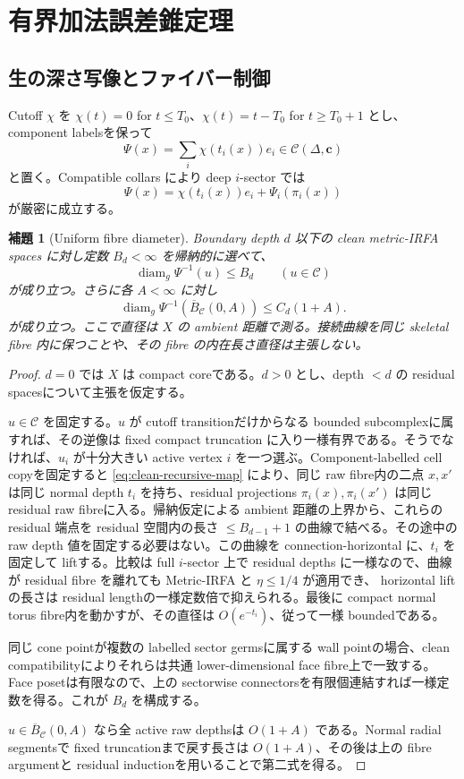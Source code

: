 \documentclass[11pt,a4paper]{ltjsarticle}
\newcommand{\diam}{\operatorname{diam}}
\newcommand{\cC}{\mathcal C}
\newcommand{\ov}{\overline}
\theoremstyle{plain}
\newtheorem{lemma}[lemma]{補題}
\theoremstyle{definition}
\theoremstyle{remark}
\begin{document}
\section{有界加法誤差錐定理}
\label{sec:rough}

\subsection{生の深さ写像とファイバー制御}
Cutoff $\chi$ を $\chi(t)=0$ for $t\le T_0$、$\chi(t)=t-T_0$ for $t\ge T_0+1$ とし、component labelsを保って
\begin{equation}
\label{eq:rawmap}
 \Psi(x)=\sum_i\chi(t_i(x))e_i\in\cC(\Delta,\bm c)
\end{equation}
と置く。Compatible collars により deep $i$-sector では
\begin{equation}
\label{eq:rawrecursive}
 \Psi(x)=\chi(t_i(x))e_i+\Psi_i(\pi_i(x))
\end{equation}
が厳密に成立する。

\begin{lemma}[Uniform fibre diameter]
\label{lem:fibres}
Boundary depth $d$ 以下の clean metric-IRFA spaces に対し定数 $B_d<\infty$ を帰納的に選べて、
\[
 \diam_g\Psi^{-1}(u)\le B_d
 \qquad(u\in\cC)
\]
が成り立つ。さらに各 $A<\infty$ に対し
\[
 \diam_g\Psi^{-1}(\ov B_\cC(0,A))\le C_d(1+A).
\]
が成り立つ。ここで直径は $X$ の ambient 距離で測る。接続曲線を同じ
skeletal fibre 内に保つことや、その fibre の内在長さ直径は主張しない。
\end{lemma}
\begin{proof}
$d=0$ では $X$ は compact coreである。$d>0$ とし、depth $<d$ の residual spacesについて主張を仮定する。

$u\in\cC$ を固定する。$u$ が cutoff transitionだけからなる bounded subcomplexに属すれば、その逆像は fixed compact truncation に入り一様有界である。そうでなければ、$u_i$ が十分大きい active vertex $i$ を一つ選ぶ。Component-labelled cell copyを固定すると \eqref{eq:clean-recursive-map} により、同じ raw fibre内の二点 $x,x'$ は同じ normal depth $t_i$ を持ち、residual projections $\pi_i(x),\pi_i(x')$ は同じ residual raw fibreに入る。帰納仮定による ambient 距離の上界から、これらの residual 端点を residual 空間内の長さ $\le B_{d-1}+1$ の曲線で結べる。その途中の raw depth 値を固定する必要はない。この曲線を connection-horizontal に、$t_i$ を固定して liftする。比較は full $i$-sector 上で residual depths に一様なので、曲線が residual fibre を離れても Metric-IRFA と $\eta\le1/4$ が適用でき、 horizontal lift の長さは residual lengthの一様定数倍で抑えられる。最後に compact normal torus fibre内を動かすが、その直径は $O(e^{-t_i})$、従って一様 boundedである。

同じ cone pointが複数の labelled sector germsに属する wall pointの場合、clean compatibilityによりそれらは共通 lower-dimensional face fibre上で一致する。Face posetは有限なので、上の sectorwise connectorsを有限個連結すれば一様定数を得る。これが $B_d$ を構成する。

$u\in\ov B_\cC(0,A)$ なら全 active raw depthsは $O(1+A)$ である。Normal radial segmentsで fixed truncationまで戻す長さは $O(1+A)$、その後は上の fibre argumentと residual inductionを用いることで第二式を得る。
\end{proof}
\end{document}
